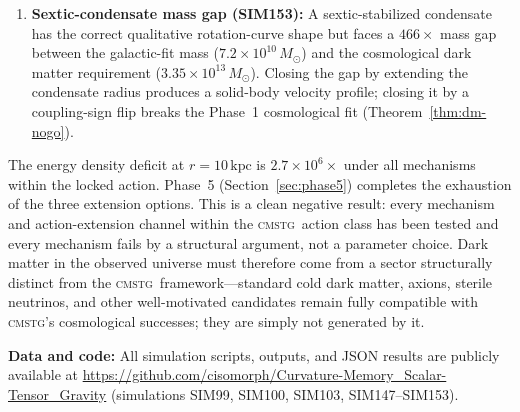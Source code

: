 \documentclass[12pt,a4paper]{article}
\newcommand{\CMSTG}{\textsc{cmstg}}
\theoremstyle{plain}
\begin{document}
\begin{enumerate}
  \item \textbf{Sextic-condensate mass gap (SIM153):} A sextic-stabilized
    condensate has the correct qualitative rotation-curve shape but faces a
    $466\times$ mass gap between the galactic-fit mass ($7.2\times10^{10}\,M_\odot$)
    and the cosmological dark matter requirement ($3.35\times10^{13}\,M_\odot$).
    Closing the gap by extending the condensate radius produces a solid-body
    velocity profile; closing it by a coupling-sign flip breaks the Phase~1
    cosmological fit (Theorem~\ref{thm:dm-nogo}).
\end{enumerate}

The energy density deficit at $r = 10\,\mathrm{kpc}$ is $2.7\times10^6\times$
under all mechanisms within the locked action.  Phase~5 (Section~\ref{sec:phase5})
completes the exhaustion of the three extension options.  This is a clean negative
result: every mechanism and action-extension channel within the \CMSTG\ action class
has been tested and every mechanism fails by a structural argument, not a parameter
choice.  Dark matter in the observed universe must therefore come from a sector
structurally distinct from the \CMSTG\ framework---standard cold dark matter,
axions, sterile neutrinos, and other well-motivated candidates remain fully
compatible with \CMSTG's cosmological successes; they are simply not generated
by it.

\bigskip
\noindent\textbf{Data and code:}
All simulation scripts, outputs, and JSON results are publicly available at
\url{https://github.com/cisomorph/Curvature-Memory_Scalar-Tensor_Gravity}
(simulations SIM99, SIM100, SIM103, SIM147--SIM153).
\end{document}
